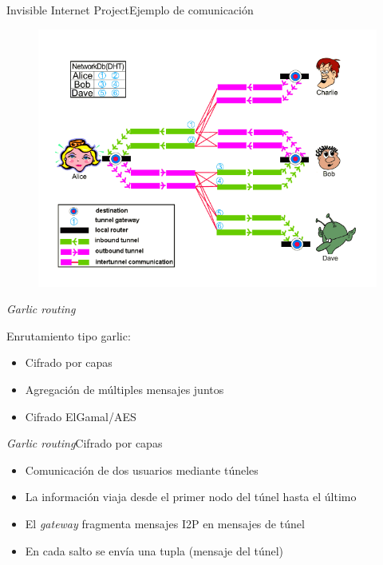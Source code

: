 \documentclass[spanish]{beamer}
\begin{document}
\begin{frame}{Invisible Internet Project}{Ejemplo de comunicación}
\begin{figure}
	\centering
	\includegraphics[width=.8\textwidth]{img/alice_bob_message}
\end{figure}
	
\end{frame}


\begin{frame}{\textit{Garlic routing}}
	
Enrutamiento tipo garlic:


\begin{itemize}
	\item Cifrado por capas
	\item Agregación de múltiples mensajes juntos
	\item Cifrado ElGamal/AES
\end{itemize}
	
\end{frame}


\begin{frame}{\textit{Garlic routing}}{Cifrado por capas}
	
 
 
 \begin{itemize}
 	\item Comunicación de dos usuarios mediante túneles
 	\item La información viaja desde el primer nodo del túnel hasta el último
 	\item El \textit{gateway} fragmenta mensajes I2P en mensajes de túnel
 	\item En cada salto se envía una tupla (mensaje del túnel)
 \end{itemize}
 
 
 \end{frame}
 
\end{document}
